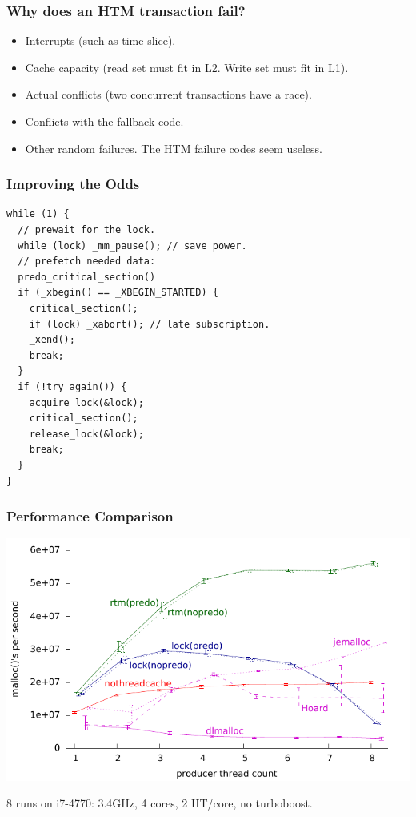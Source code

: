 \documentclass[xcolor=dvipsnames,14pt]{beamer}
\begin{document}
\begin{frame}
\frametitle{Why does an HTM transaction fail?}
\begin{itemize}
\item Interrupts (such as time-slice).
\item Cache capacity (read set must fit in L2.  Write set must fit in L1).
\item Actual conflicts (two concurrent transactions have a race).
\item Conflicts with the fallback code.
\item Other random failures.  The HTM failure codes seem useless.
\end{itemize}

\end{frame}

\begin{frame}[fragile]
\frametitle{Improving the Odds}

\begin{verbatim}
while (1) {
  // prewait for the lock.
  while (lock) _mm_pause(); // save power.
  // prefetch needed data:
  predo_critical_section()
  if (_xbegin() == _XBEGIN_STARTED) {
    critical_section();
    if (lock) _xabort(); // late subscription.
    _xend();
    break;
  }
  if (!try_again()) {
    acquire_lock(&lock);
    critical_section();
    release_lock(&lock);
    break;
  }
}
\end{verbatim}
\end{frame}

\begin{frame}
\frametitle{Performance Comparison}
\hspace*{-.7cm}\includegraphics{new-malloc-test-1K-aggregated.pdf}

{\small 8 runs on i7-4770: 3.4GHz, 4 cores, 2 HT/core, no turboboost.}
\end{frame}
\end{document}
